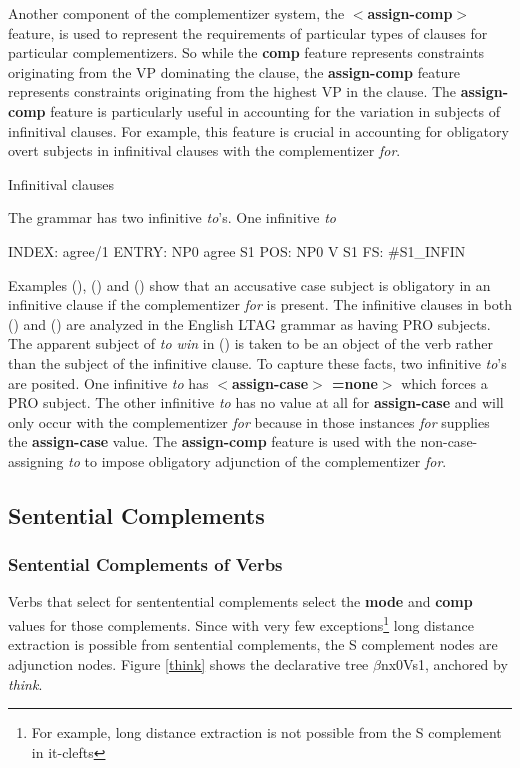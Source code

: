 Another component of the complementizer system, the {\bf
$<$assign-comp$>$} feature, is used to represent the requirements of
particular types of clauses for particular complementizers.  So while
the {\bf comp} feature represents  constraints originating from the VP
dominating the clause, the {\bf assign-comp} feature represents constraints
originating from the highest VP in the clause. The {\bf assign-comp}
feature is particularly useful in accounting for the variation in
subjects of infinitival clauses. For
example, this feature is crucial in accounting for obligatory overt
subjects in infinitival clauses with the complementizer {\it for}.

Infinitival clauses

 The grammar has two infinitive {\it to}'s. One infinitive
{\it to\/}

INDEX:	agree/1
ENTRY:	NP0 agree S1
POS:	NP0 V S1
FS:	#S1_INFIN

  



Examples (), () and () show that an accusative
case subject is obligatory in an infinitive clause if the
complementizer {\it for\/} is present. The infinitive clauses in both
() and () are analyzed in the English LTAG grammar as
having PRO subjects.  The apparent subject of {\it to win\/} in
() is taken to be an object of the verb rather than the subject
of the infinitive clause.  To capture these facts, two infinitive
{\it to}'s are posited. One infinitive {\it to\/} has {\bf
$<$assign-case$>$ =none$>$} which forces a PRO subject. The other
infinitive {\it to\/} has no value at all for {\bf assign-case} and
will only occur with the complementizer {\it for\/} because in those
instances {\it for} supplies the {\bf assign-case} value. The {\bf
assign-comp} feature is used with the non-case-assigning {\it to} to
impose obligatory adjunction of the complementizer {\it for}.

 
\subsection{Sentential Complements}
\subsubsection{Sentential Complements of Verbs}
Verbs that select for sententential complements select the {\bf mode}
and {\bf comp} values for those complements. Since with very few
exceptions\footnote{For example, long distance extraction is not
possible from the S complement in it-clefts} long distance extraction
is possible from sentential complements, the S complement nodes are
adjunction nodes. Figure \ref{think} shows the declarative tree
$\beta$nx0Vs1, anchored by {\it think}.  

